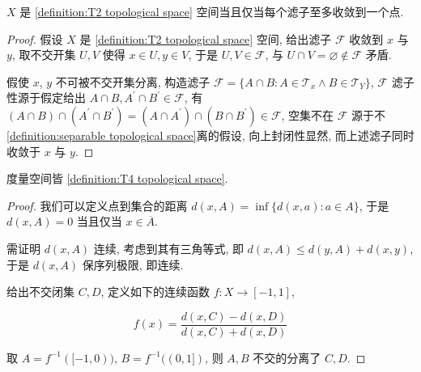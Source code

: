 \begin{lemma}
    \(X\) 是 \ref{definition:T2 topological space} 空间当且仅当每个滤子至多收敛到一个点.

    \begin{proof}
        假设 \(X\) 是 \ref{definition:T2 topological space} 空间, 给出滤子 \(\mathcal{F}\) 收敛到 \(x\) 与 \(y\), 取不交开集 \(U,V\) 使得 \(x \in U, y \in V\),
        于是 \(U,V \in \mathcal{F}\), 与 \(U \cap V = \varnothing \notin \mathcal{F}\) 矛盾.

        假使 \(x\), \(y\) 不可被不交开集分离, 构造滤子 \(\mathcal{F} = \{A \cap B : A \in \mathcal{T}_x \land B \in \mathcal{T}_Y\}\),
        \(\mathcal{F}\) 滤子性源于假定给出 \(A \cap B, A^\prime \cap B^\prime \in \mathcal{F}\), 有 \((A \cap B) \cap (A^\prime \cap B^\prime) = (A \cap A^\prime) \cap (B \cap B^\prime) \in \mathcal{F}\),
        空集不在 \(\mathcal{F}\) 源于不\ref{definition:separable topological space}离的假设, 向上封闭性显然, 而上述滤子同时收敛于 \(x\) 与 \(y\).
    \end{proof}
\end{lemma}

\begin{lemma}
    度量空间皆 \ref{definition:T4 topological space}.

    \begin{proof}
        我们可以定义点到集合的距离 \(d(x,A) = \inf \{d(x,a) : a \in A\}\), 
        于是 \(d(x,A) = 0\) 当且仅当 \(x \in \overline{A}\).

        需证明 \(d(x,A)\) 连续, 考虑到其有三角等式, 即 \(d(x,A) \le d(y,A) + d(x,y)\), 
        于是 \(d(x,A)\) 保序列极限, 即连续.

        给出不交闭集 \(C,D\), 定义如下的连续函数 \(f : X \to [-1,1]\),

        \[
            f(x) = \frac{d(x,C) - d(x,D)}{d(x,C) + d(x,D)}
        \]

        取 \(A = f^{-1} ([-1,0))\), \(B = f^{-1} ((0,1])\), 则 \(A,B\) 不交的分离了 \(C,D\).
    \end{proof}
\end{lemma}

